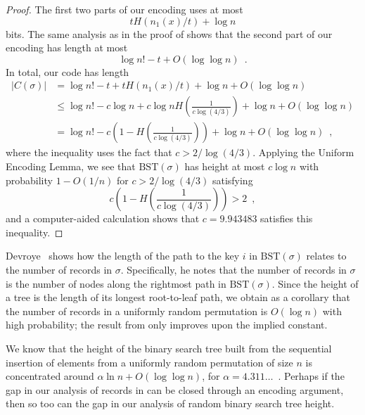 \documentclass[prodmode,acmcsur]{acmsmall}
\begin{document}
\begin{proof}
  The first two parts of our encoding uses at most
  \[
    t H(n_1(x)/t) + \log n
  \]
  bits. The same analysis as in the proof of  shows that
  the second part of our encoding has length at most
  \[
    \log n! - t + O(\log \log n) \enspace .
  \]
  In total, our code has length
  \begin{align*}
    |C(\sigma)| &= \log n! - t + t H(n_1(x)/t) + \log n + O(\log \log n) \\
                &\le \log n! - c \log n + c \log n H\left(\frac{1}{c \log (4/3)}\right) + \log n + O(\log \log n) \\
                &= \log n! - c \left(1 - H\left(\frac{1}{c \log (4/3)}\right)\right) + \log n + O(\log \log n) \enspace ,
  \end{align*}
  where the inequality uses the fact that $c > 2/\log(4/3)$. Applying
  the Uniform Encoding Lemma, we see that $\text{BST}(\sigma)$ has
  height at most $c \log n$ with probability $1 - O(1/n)$ for
  $c > 2/\log (4/3)$ satisfying
  \[
    c \left(1 - H\left(\frac{1}{c \log (4/3)}\right)\right) > 2 \enspace ,
  \]
  and a computer-aided calculation shows that 
  $c = 9.943483$ 
  satisfies this inequality.
\end{proof}

\begin{rem}
  Devroye~\cite{devroye:records} shows how the length of the path to
  the key $i$ in $\text{BST}(\sigma)$ relates to the number of records
  in $\sigma$. Specifically, he notes that the number of records in
  $\sigma$ is the number of nodes along the rightmost path in
  $\text{BST}(\sigma)$. Since the height of a tree is the length of
  its longest root-to-leaf path, we obtain as a corollary that the
  number of records in a uniformly random permutation is $O(\log n)$
  with high probability; the result from  only
  improves upon the implied constant.
\end{rem}

\begin{rem}
  We know that the height of the binary search tree built from the
  sequential insertion of elements from a uniformly random permutation
  of size $n$ is concentrated around $\alpha \ln n + O(\log \log n)$,
  for $\alpha = 4.311\dots$~\cite{reed:height}. Perhaps if the gap in
  our analysis of records in  can be closed through an
  encoding argument, then so too can the gap in our analysis of random
  binary search tree height.
\end{rem}
\end{document}
